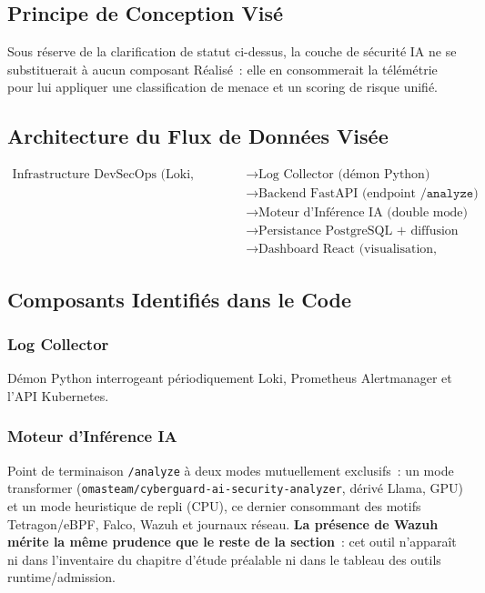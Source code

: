 \subsection{Principe de Conception Visé}

Sous réserve de la clarification de statut ci-dessus, la couche de sécurité IA ne se substituerait à aucun composant Réalisé~: elle en consommerait la télémétrie pour lui appliquer une classification de menace et un scoring de risque unifié.

\subsection{Architecture du Flux de Données Visée}

\begin{align*}
\text{Infrastructure DevSecOps (Loki, Prometheus, événements K8s)} &\longrightarrow \text{Log Collector (démon Python)} \\
&\longrightarrow \text{Backend FastAPI (endpoint } \texttt{/analyze} \text{)} \\
&\longrightarrow \text{Moteur d'Inférence IA (double mode)} \\
&\longrightarrow \text{Persistance PostgreSQL + diffusion WebSocket} \\
&\longrightarrow \text{Dashboard React (visualisation, recommandations)}
\end{align*}

\subsection{Composants Identifiés dans le Code}

\subsubsection{Log Collector}
Démon Python interrogeant périodiquement Loki, Prometheus Alertmanager et l'API Kubernetes.

\subsubsection{Moteur d'Inférence IA}
Point de terminaison \texttt{/analyze} à deux modes mutuellement exclusifs~: un mode transformer (\texttt{omasteam/cyberguard-ai-security-analyzer}, dérivé Llama, GPU) et un mode heuristique de repli (CPU), ce dernier consommant des motifs Tetragon/eBPF, Falco, Wazuh et journaux réseau. \textbf{La présence de Wazuh mérite la même prudence que le reste de la section}~: cet outil n'apparaît ni dans l'inventaire du chapitre d'étude préalable ni dans le tableau des outils runtime/admission. %

